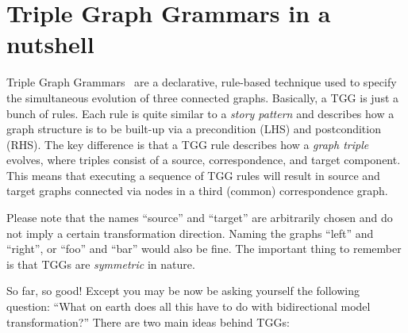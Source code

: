 \chapter{Triple Graph Grammars in a nutshell}
\label{sec:nutshell}
\genHeader

Triple Graph Grammars~\cite{tgg:schuerr_94,sk2008,Klar2010} are a declarative, rule-based technique used to specify the simultaneous evolution of three connected graphs. 
Basically, a TGG is just a bunch of rules. 
Each rule is quite similar to a \emph{story pattern} and describes how a graph structure is to be built-up
via a precondition (LHS) and postcondition (RHS). 
The key difference is that a TGG rule describes how a \emph{graph triple} evolves, where triples consist of a source, correspondence, and target component. 
This means that executing a sequence of TGG rules will result in source and target graphs connected via nodes in a third (common) correspondence graph.

\vspace{0.25cm}

Please note that the names ``source'' and ``target'' are arbitrarily chosen and do not imply a certain transformation direction. 
Naming the graphs ``left'' and ``right'', or ``foo'' and ``bar'' would also be fine. 
The important thing to remember is that TGGs are \emph{symmetric} in nature.

\vspace{0.25cm}

So far, so good! Except you may be now be asking yourself the following question: ``What on earth does all this have to do with bidirectional model transformation?'' 
There are two main ideas behind TGGs:

